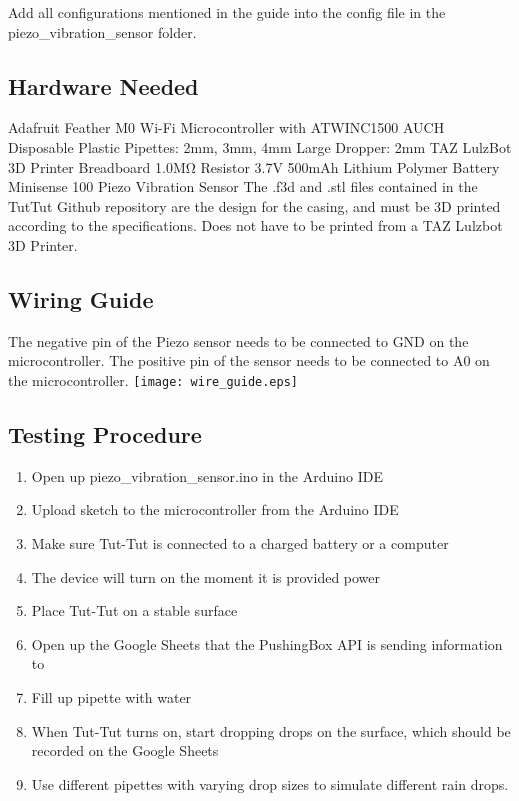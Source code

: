 \documentclass[letterpaper,10pt,draftclsnofoot,onecolumn]{article}
\begin{document}
Add all configurations mentioned in the guide into the config file in the piezo\_vibration\_sensor folder.

\subsection{Hardware Needed}
Adafruit Feather M0 Wi-Fi Microcontroller with ATWINC1500
\newline
AUCH Disposable Plastic Pipettes: 2mm, 3mm, 4mm
\newline
Large Dropper: 2mm
\newline
TAZ LulzBot 3D Printer
\newline
Breadboard
\newline
1.0MΩ Resistor
\newline
3.7V 500mAh Lithium Polymer Battery
\newline
Minisense 100 Piezo Vibration Sensor
\newline
\newline
The .f3d and .stl files contained in the TutTut Github repository are the design for the casing, and must be 3D printed according to the specifications. Does not have to be printed from a TAZ Lulzbot 3D Printer.
\newline

\subsection{Wiring Guide}
The negative pin of the Piezo sensor needs to be connected to GND on the microcontroller. The positive pin of the sensor needs to be connected to A0 on the microcontroller.
\newline
\texttt{[image: wire\_guide.eps]}

\subsection{Testing Procedure}
\begin{enumerate}
    \item Open up piezo\_vibration\_sensor.ino in the Arduino IDE
    \item Upload sketch to the microcontroller from the Arduino IDE
    \item Make sure Tut-Tut is connected to a charged battery or a computer
    \item The device will turn on the moment it is provided power
    \item Place Tut-Tut on a stable surface
    \item Open up the Google Sheets that the PushingBox API is sending information to
    \item Fill up pipette with water
    \item When Tut-Tut turns on, start dropping drops on the surface, which should be recorded on the Google Sheets
    \item Use different pipettes with varying drop sizes to simulate different rain drops.
\end{enumerate}
\end{document}
